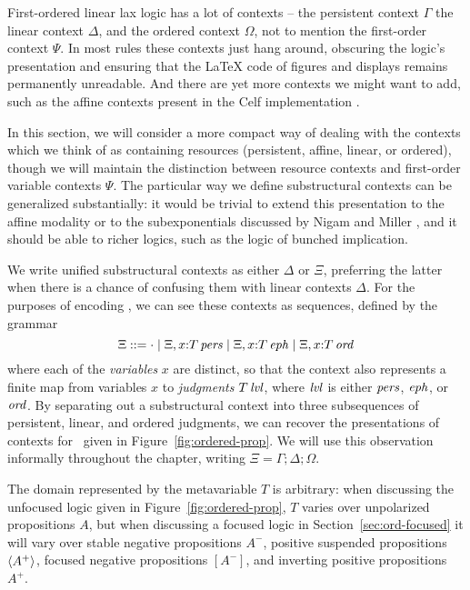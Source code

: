 First-ordered linear lax logic has a lot of contexts -- the persistent
context $\Gamma$ the linear context $\Delta$, and the ordered context
$\Omega$, not to mention the first-order context $\Psi$. In most rules
these contexts just hang around, obscuring the logic's presentation
and ensuring that the {\LaTeX} code of figures and displays remains
permanently unreadable. And there are yet more contexts we might want to 
add, such as the affine contexts present in the Celf implementation
\cite{schacknielsen08celf}.

In this section, we will consider a more compact way of dealing with
the contexts which we think of as containing resources (persistent,
affine, linear, or ordered), though we will maintain the distinction
between resource contexts and first-order variable 
contexts $\Psi$.  The particular way we define substructural contexts
can be generalized substantially: it would be trivial to extend
this presentation to the affine modality or to the subexponentials
discussed by Nigam and Miller \cite{nigam09algorithmic}, and it should
be able to richer logics, such as the logic of bunched implication.

We write unified substructural contexts as either $\Delta$ or $\Xi$,
preferring the latter when there is a chance of confusing them with
linear contexts $\Delta$. For the purposes of encoding \ollll, we can
see these contexts as sequences, defined by the grammar
\[
\Xi ::= \cdot 
  \mid \Xi, x{:}{T}\,{{\it pers}}
  \mid \Xi, x{:}{T}\,{{\it eph}}
  \mid \Xi, x{:}{T}\,{{\it ord}}
\]
where each of the {\em variables} $x$ are distinct, so that the
context also represents a finite map from variables $x$ to {\it
  judgments} ${T}\,{{\it lvl}}$, where ${\it lvl}$ is either ${\it pers}$, ${\it eph}$,
or ${\it ord}$.  By separating out a substructural context into three
subsequences of persistent, linear, and ordered judgments, we can
recover the presentations of contexts for \ollll~given in
Figure~\ref{fig:ordered-prop}. We will use this observation informally
throughout the chapter, writing $\Xi = \Gamma; \Delta; \Omega$.

The domain represented by the metavariable $T$ is arbitrary: when
discussing the unfocused logic given in Figure~\ref{fig:ordered-prop},
$T$ varies over unpolarized propositions $A$, but when discussing a
focused logic in Section~\ref{sec:ord-focused} it will vary over
stable negative propositions $A^-$, positive suspended propositions
$\langle {A^+} \rangle$, focused negative propositions $[A^-]$, and inverting
positive propositions $A^+$.



